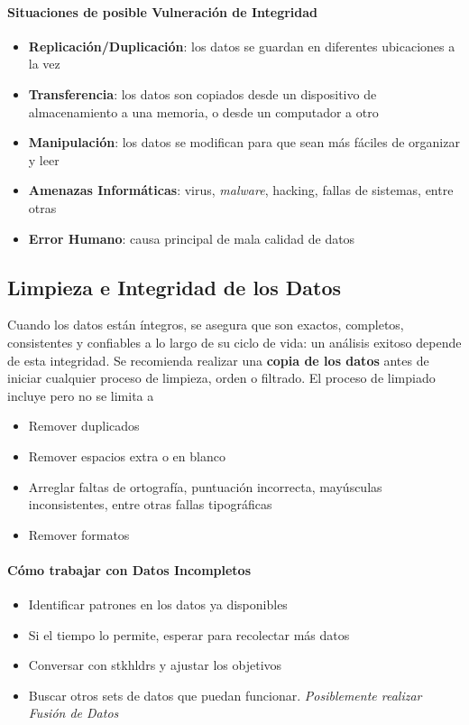 \paragraph{Situaciones de posible Vulneración de Integridad}
\begin{itemize}
    \item {\textbf{Replicación/Duplicación}: los datos se guardan en diferentes ubicaciones a la vez}
    \item {\textbf{Transferencia}: los datos son copiados desde un dispositivo de almacenamiento a una memoria, o desde un computador a otro}
    \item {\textbf{Manipulación}: los datos se modifican para que sean más fáciles de organizar y leer} 
    \item {\textbf{Amenazas Informáticas}: virus, \textit{malware}, hacking, fallas de sistemas, entre otras}
    \item {\textbf{Error Humano}: causa principal de mala calidad de datos}
\end{itemize}

\subsection{Limpieza e Integridad de los Datos}
Cuando los datos están íntegros, se asegura que son exactos, completos, consistentes y confiables a lo largo de su ciclo de vida: un análisis exitoso depende de esta integridad. Se recomienda realizar una \textbf{copia de los datos} antes de iniciar cualquier proceso de limpieza, orden o filtrado. El proceso de limpiado incluye pero no se limita a 
\begin{itemize}
    \item {Remover duplicados}
    \item {Remover espacios extra o en blanco}
    \item {Arreglar faltas de ortografía, puntuación incorrecta, mayúsculas inconsistentes, entre otras fallas tipográficas}
    \item {Remover formatos}
\end{itemize}
\paragraph{Cómo trabajar con Datos Incompletos}
\begin{itemize}
    \item {Identificar patrones en los datos ya disponibles}
    \item {Si el tiempo lo permite, esperar para recolectar más datos}
    \item {Conversar con \gls{stkhldrs} y ajustar los objetivos}
    \item {Buscar otros sets de datos que puedan funcionar. \textit{Posiblemente realizar Fusión de Datos}}
\end{itemize}

